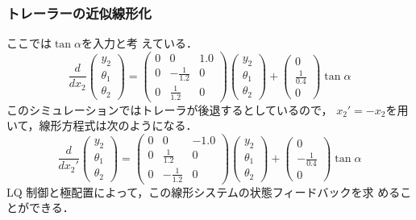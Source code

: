 \begin{frame}[t] 
\frametitle{トレーラーの近似線形化}

ここでは$\tan \alpha$を入力と考
      えている．
\begin{equation}
 \frac{d}{dx_2}\left(\begin{array}{c}
     y_2 \\
     \theta_1 \\
     \theta_2
   \end{array} \right) = \left(\begin{array}{ccc}
     0 & 0  & 1.0 \\
     0 & -\frac{1}{1.2} & 0 \\
     0 & \frac{1}{1.2}  & 0 
   \end{array} \right) \left(\begin{array}{c}
     y_2 \\
     \theta_1 \\
     \theta_2
   \end{array} \right) + \left(\begin{array}{c}
     0 \\
     \frac{1}{0.4} \\
     0
   \end{array} \right) \tan \alpha
\end{equation}
      このシミュレーションではトレーラが後退するとしているので，
      $x_2' = -x_2$を用いて，線形方程式は次のようになる．
\begin{equation}
 \frac{d}{dx_2'}\left(\begin{array}{c}
     y_2 \\
     \theta_1 \\
     \theta_2
   \end{array} \right) = \left(\begin{array}{ccc}
     0 & 0  & -1.0 \\
     0 & \frac{1}{1.2} & 0 \\
     0 & -\frac{1}{1.2} & 0 
   \end{array} \right) \left(\begin{array}{c}
     y_2 \\
     \theta_1 \\
     \theta_2
   \end{array} \right) + \left(\begin{array}{c}
     0 \\
     -\frac{1}{0.4} \\
     0
   \end{array} \right) \tan \alpha
\end{equation}
      LQ 制御と極配置によって，この線形システムの状態フィードバックを求
      めることができる．

\end{frame}


